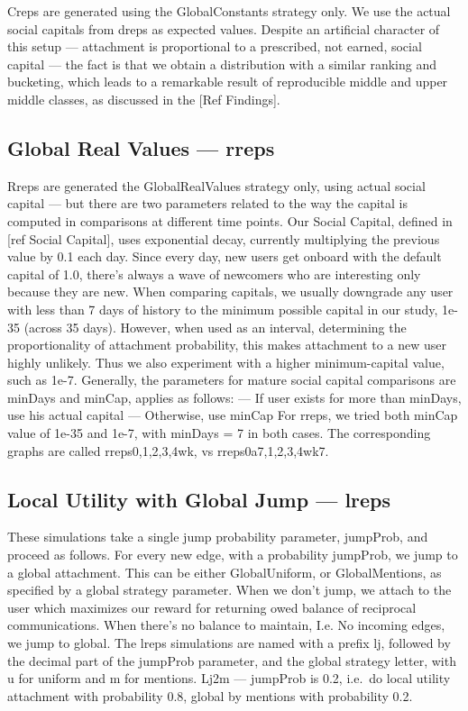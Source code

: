 \documentclass[10pt,oneside]{memoir}
\begin{document}
Creps are generated using the GlobalConstants strategy only.  We use the actual social capitals from dreps as expected values.  Despite an artificial character of this setup --- attachment is proportional to a prescribed, not earned, social capital --- the fact is that we obtain a distribution with a similar ranking and bucketing, which leads to a remarkable result of reproducible middle and upper middle classes, as discussed in the [Ref Findings].


\subsection{Global Real Values --- rreps}
\label{globalrealvaluesrreps}

Rreps are generated the GlobalRealValues strategy only, using actual social capital --- but there are two parameters related to the way the capital is computed in comparisons at different time points.  Our Social Capital, defined in [ref Social Capital], uses exponential decay, currently multiplying the previous value by 0.1 each day.  Since every day, new users get onboard with the default capital of 1.0, there's always a wave of newcomers who are interesting only because they are new.  When comparing capitals, we usually downgrade any user with less than 7 days of history to the minimum possible capital in our study, 1e-35 (across 35 days).  However, when used as an interval, determining the proportionality of attachment probability, this makes attachment to a new user highly unlikely.  Thus we also experiment with a higher minimum-capital value, such as 1e-7.  Generally, the parameters for mature social capital comparisons are minDays and minCap, applies as follows:
--- If user exists for more than minDays, use his actual capital
--- Otherwise, use minCap
For rreps, we tried both minCap value of 1e-35 and 1e-7, with minDays = 7 in both cases.  The corresponding graphs are called rreps{0,{1,2,3,4}wk}, vs rreps{0a7,{1,2,3,4}wk7}.


\subsection{Local Utility with Global Jump --- lreps}
\label{localutilitywithglobaljumplreps}

These simulations take a single jump probability parameter, jumpProb, and proceed as follows.  For every new edge, with a probability jumpProb, we jump to a global attachment.  This can be either GlobalUniform, or GlobalMentions, as specified by a global strategy parameter.  When we don't jump, we attach to the user which maximizes our reward for returning owed balance of reciprocal communications.  When there's no balance to maintain, I.e. No incoming edges, we jump to global.
The lreps simulations are named with a prefix lj, followed by the decimal part of the jumpProb parameter, and the global strategy letter, with u for uniform and m for mentions.
Lj2m --- jumpProb is 0.2, i.e.\ do local utility attachment with probability 0.8, global by mentions with probability 0.2.
\end{document}
